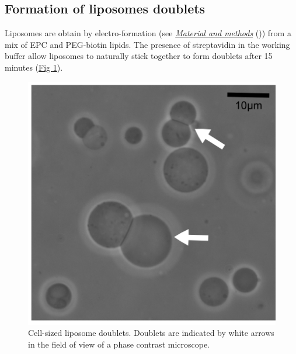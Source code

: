 \documentclass[A4paperpaper,11pt,english]{sphinxmanual}
\begin{document}
\subsection{Formation of liposomes doublets}
\label{index-latex:formation-of-liposomes-doublets}
Liposomes are obtain by electro-formation (see {\hyperref[index-latex:electroformation]{\emph{Material and methods}}} ()) from a mix of EPC and PEG-biotin lipids. The presence of
streptavidin in the working buffer allow liposomes to naturally stick together
to form doublets after 15 minutes (\hyperref[index-latex:fig1a]{Fig  \ref*{index-latex:fig1a}}).
\begin{figure}[htbp]
\centering
\capstart

\includegraphics[width=0.500\linewidth]{Fig_01-A.png}
\caption{Cell-sized liposome doublets. Doublets are indicated by white arrows in
the field of view of a phase contrast microscope.}\label{index-latex:fig1a}\end{figure}
\end{document}
